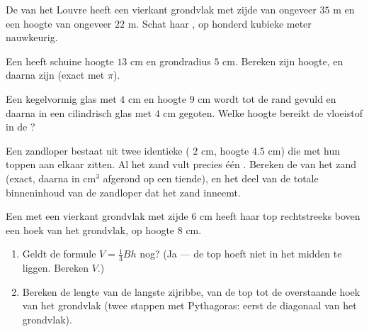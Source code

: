\begin{exercise}[$\star\star$]\label{exo:g8:solids:7}
De  van het Louvre heeft een vierkant grondvlak met zijde van ongeveer
$35$ m en een hoogte van ongeveer $22$ m. Schat haar , op honderd kubieke
meter nauwkeurig.
\end{exercise}

\begin{exercise}[$\star\star$]\label{exo:g8:solids:8}
Een  heeft schuine hoogte $13$ cm en grondradius $5$ cm. Bereken zijn
hoogte, en daarna zijn  (exact met $\pi$).
\end{exercise}

\begin{exercise}[$\star\star$]\label{exo:g8:solids:9}
Een kegelvormig glas met  $4$ cm en hoogte $9$ cm wordt tot de rand gevuld
en daarna in een cilindrisch glas met  $4$ cm gegoten. Welke hoogte bereikt
de vloeistof in de ?
\end{exercise}

\begin{exercise}[$\star\star$]\label{exo:g8:solids:10}
Een zandloper bestaat uit twee identieke  ( $2$ cm, hoogte $4.5$ cm)
die met hun toppen aan elkaar zitten. Al het zand vult precies één . Bereken
de  van het zand (exact, daarna in cm$^3$ afgerond op een tiende), en het
deel van de totale binneninhoud van de zandloper dat het zand inneemt.
\end{exercise}

\begin{exercise}[$\star\star\star$]\label{exo:g8:solids:11}
Een  met een vierkant grondvlak met zijde $6$ cm heeft haar top
rechtstreeks boven een hoek van het grondvlak, op hoogte $8$ cm.
\begin{enumerate}
  \item Geldt de formule $V = \frac13 Bh$ nog? (Ja --- de top hoeft niet in het
        midden te liggen. Bereken $V$.)
  \item Bereken de lengte van de langste zijribbe, van de top tot de overstaande
        hoek van het grondvlak (twee stappen met Pythagoras: eerst de diagonaal
        van het grondvlak).
\end{enumerate}
\end{exercise}


